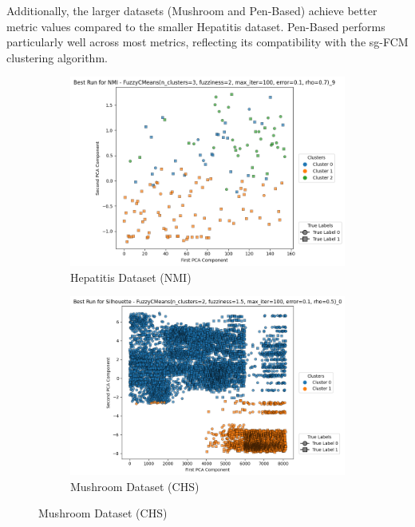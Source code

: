 Additionally, the larger datasets (Mushroom and Pen-Based) achieve better metric values compared to the smaller Hepatitis dataset. Pen-Based performs particularly well across most metrics, reflecting its compatibility with the sg-FCM clustering algorithm. 


\begin{figure}[H]
	\centering
	\begin{subfigure}{0.32\textwidth}
		\centering
		\includegraphics[width=\linewidth]{figures/FuzzyCMeans/Hepatitis/best_run_NMI.png}
		\caption{Hepatitis Dataset (NMI)}
	\end{subfigure}
	\hfill
	\begin{subfigure}{0.32\textwidth}
		\centering
		\includegraphics[width=\linewidth]{figures/FuzzyCMeans/Mushroom/best_run_Silhouette.png}
		\caption{Mushroom Dataset (CHS)}
	\end{subfigure}
	\hfill

\end{figure}

